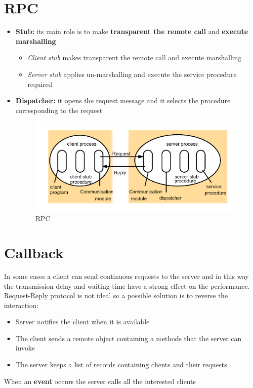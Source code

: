 \section{RPC}
\begin{itemize}
    \item \textbf{Stub:} its main role is to make \textbf{transparent the remote call} and \textbf{execute marshalling}
        \begin{itemize}
            \item \textit{Client stub} makes transparent the remote call and execute marshalling
            \item \textit{Server stub} applies un-marshalling and execute the service procedure required
        \end{itemize}
    \item \textbf{Dispatcher:} it opens the request message and it selects the procedure corresponding to the request
    
    \begin{figure}[!h]
            \centering
            \includegraphics[width=.7\linewidth]{images/InterprocessCommunication/rpc.png}
            \caption{RPC}
    \end{figure}
    
\end{itemize}

\newpage

\section{Callback}
In some cases a client can send continuous requests to the server and in this way the transmission delay and waiting time have a strong effect on the performance.
Request-Reply protocol is not ideal so a possible solution is to reverse the interaction:
\begin{itemize}
    \item Server notifies the client when it is available
    \item The client sends a remote object containing a methods that the server can invoke
    \item The server keeps a list of records containing clients and their requests
\end{itemize}
When an \textbf{event} occurs the server calls all the interested clients

